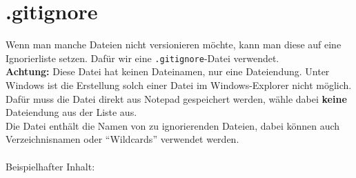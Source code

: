 \documentclass[accentcolor=TUDa-8b,colorbacktitle,12pt]{tudaexercise}
\begin{document}
\section*{.gitignore}
Wenn man manche Dateien nicht versionieren möchte, kann man diese auf eine Ignorierliste setzen. Dafür wir eine \lstinline|.gitignore|-Datei verwendet.\\
\textbf{Achtung:} Diese Datei hat keinen Dateinamen, nur eine Dateiendung. Unter Windows ist die Erstellung solch einer Datei im Windows-Explorer nicht möglich. Dafür muss die Datei direkt aus Notepad gespeichert werden, wähle dabei \textbf{keine} Dateiendung aus der Liste aus.\\
Die Datei enthält die Namen von zu ignorierenden Dateien, dabei können auch Verzeichnisnamen oder "`Wildcards"' verwendet werden.\\
\\
Beispielhafter Inhalt:

\end{document}
